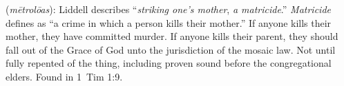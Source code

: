 \item[Mother-murderer,]

(\textit{mētrolōas}):
Liddell describes ``\emph{striking one's mother}, \emph{a matricide}.'' \emph{Matricide} defines as ``a crime in which a person kills their mother.'' If anyone kills their mother, they have committed murder. If anyone kills their parent, they should fall out of the Grace of God unto the jurisdiction of the mosaic law. Not until fully repented of the thing, including proven sound before the congregational elders.
Found in 1~Tim 1:9.
